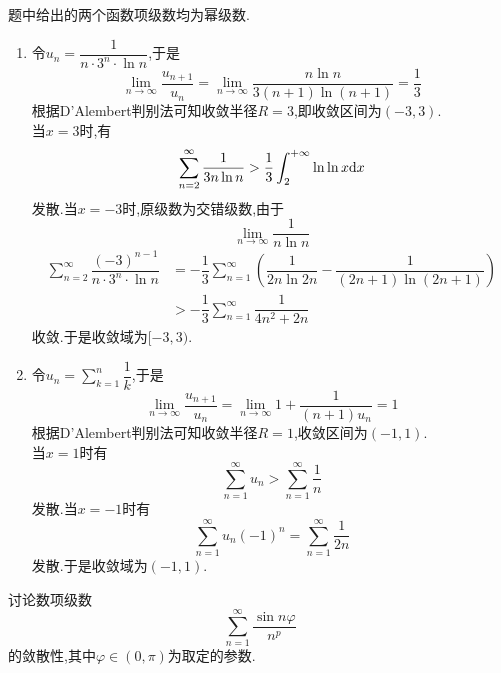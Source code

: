 \documentclass{ctexart}
\begin{document}
\begin{solution}
    题中给出的两个函数项级数均为幂级数.
    \begin{enumerate}[label=\tbf{(\arabic*)},topsep=0pt,parsep=0pt,itemsep=0pt,partopsep=0pt]
        \item 令$u_n=\dfrac{1}{n\cdot 3^n\cdot\ln n}$,于是
            \[\lim_{n\to\infty}\dfrac{u_{n+1}}{u_n}=\lim_{n\to\infty}\dfrac{n\ln n}{3(n+1)\ln(n+1)}=\dfrac13\]
            根据D'Alembert判别法可知收敛半径$R=3$,即收敛区间为$(-3,3)$.\\
            当$x=3$时,有
            \[\sum_{n=2}^{\infty}\dfrac{1}{3n\ln n}>\dfrac{1}{3}\int_2^{+\infty}\ln\ln x\mathrm{d} x\]
            发散.当$x=-3$时,原级数为交错级数,由于
            \[\lim_{n\to\infty}\dfrac{1}{n\ln n}\]
            \[\begin{aligned}
                \sum_{n=2}^{\infty}\dfrac{(-3)^{n-1}}{n\cdot3^n\cdot\ln n}
                &= -\dfrac13\sum_{n=1}^{\infty}\left(\dfrac{1}{2n\ln 2n}-\dfrac{1}{(2n+1)\ln(2n+1)}\right) \\
                &> -\dfrac13\sum_{n=1}^{\infty}\dfrac{1}{4n^2+2n}
            \end{aligned}\]
            收敛.于是收敛域为$[-3,3)$.
        \item 令$u_n=\displaystyle\sum_{k=1}^n\dfrac{1}{k}$,于是
            \[\lim_{n\to\infty}\dfrac{u_{n+1}}{u_n}=\lim_{n\to\infty}1+\dfrac{1}{(n+1)u_n}=1\]
            根据D'Alembert判别法可知收敛半径$R=1$,收敛区间为$(-1,1)$.\\
            当$x=1$时有
            \[\sum_{n=1}^{\infty}u_n>\sum_{n=1}^{\infty}\dfrac1n\]
            发散.当$x=-1$时有
            \[\sum_{n=1}^{\infty}u_n(-1)^n=\sum_{n=1}^{\infty}\dfrac{1}{2n}\]
            发散.于是收敛域为$(-1,1)$.
    \end{enumerate}
\end{solution}
\begin{problem}[5.(10\songti{分})]
    讨论数项级数
    \[\sum_{n=1}^{\infty}\dfrac{\sin n\varphi}{n^p}\]
    的敛散性,其中$\varphi\in(0,\pi)$为取定的参数.
\end{problem}
\end{document}
